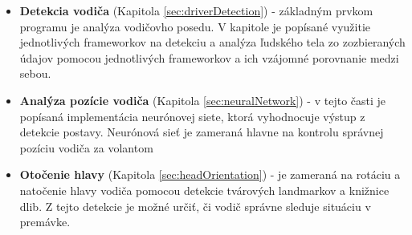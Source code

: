 \documentclass[slovak,master,dept460,male,cpp,cpdeclaration]{diploma}
\begin{document}
\begin{itemize}
\item \textbf{Detekcia vodiča} (Kapitola \ref{sec:driverDetection}) - základným prvkom programu je  analýza vodičovho posedu.  V kapitole je popísané využitie jednotlivých frameworkov na detekciu a analýza ľudského tela zo zozbieraných údajov pomocou jednotlivých frameworkov a ich vzájomné porovnanie medzi sebou.


\item \textbf{Analýza pozície vodiča} (Kapitola \ref{sec:neuralNetwork}) - v tejto  časti je popísaná implementácia neurónovej siete, ktorá vyhodnocuje výstup z detekcie postavy. Neurónová sieť je zameraná hlavne  na kontrolu správnej pozíciu vodiča za volantom

\item \textbf{Otočenie hlavy} (Kapitola \ref{sec:headOrientation}) - je zameraná na rotáciu a natočenie hlavy vodiča pomocou detekcie tvárových landmarkov a knižnice dlib\cite{dlib09}. Z tejto detekcie je možné určiť, či vodič správne sleduje situáciu v premávke.





\end{itemize}

\newpage
\end{document}
